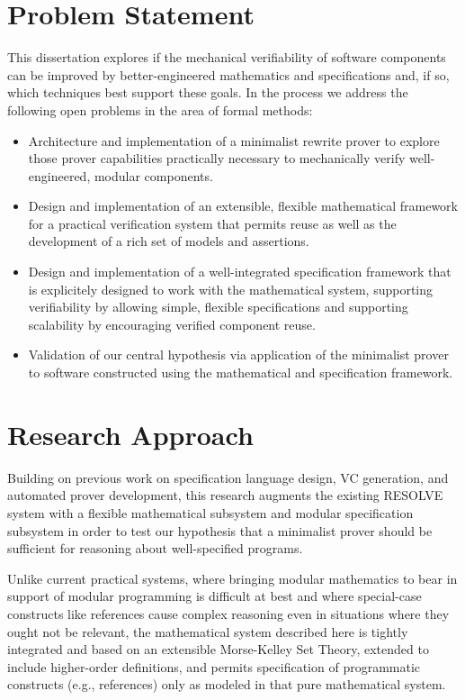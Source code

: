 \section{Problem Statement}
This dissertation explores if the mechanical verifiability of software components can be improved by better-engineered mathematics and specifications and, if so, which techniques best support these goals.  In the process we address the following open problems in the area of formal methods:

\begin{itemize}
\item Architecture and implementation of a minimalist rewrite prover to explore those prover capabilities practically necessary to mechanically verify well-engineered, modular components.
\item Design and implementation of an extensible, flexible mathematical framework for a practical verification system that permits reuse as well as the development of a rich set of models and assertions.
\item Design and implementation of a well-integrated specification framework that is explicitely designed to work with the mathematical system, supporting verifiability by allowing simple, flexible specifications and supporting scalability by encouraging verified component reuse.
\item Validation of our central hypothesis via application of the minimalist prover to software constructed using the mathematical and specification framework.
\end{itemize}

\section{Research Approach}
Building on previous work on specification language design, VC generation, and automated prover development, this research augments the existing RESOLVE\cite{sitariman1994component,Sit11} system with a flexible mathematical subsystem and modular specification subsystem in order to test our hypothesis that a minimalist prover should be sufficient for reasoning about well-specified programs.

Unlike current practical systems, where bringing modular mathematics to bear in support of modular programming is difficult at best and where special-case constructs like references cause complex reasoning even in situations where they ought not be relevant, the mathematical system described here is tightly integrated and based on an extensible Morse-Kelley Set Theory, extended to include higher-order definitions, and permits specification of programmatic constructs (e.g., references) only as modeled in that pure mathematical system.


